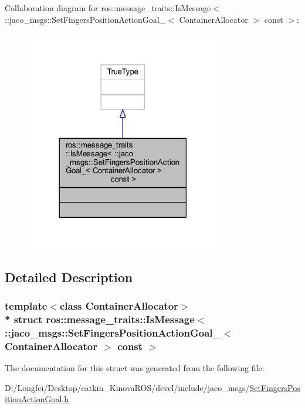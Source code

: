 Collaboration diagram for ros\+:\+:message\+\_\+traits\+:\+:Is\+Message$<$ \+:\+:jaco\+\_\+msgs\+:\+:Set\+Fingers\+Position\+Action\+Goal\+\_\+$<$ Container\+Allocator $>$ const $>$\+:
\nopagebreak
\begin{figure}[H]
\begin{center}
\leavevmode
\includegraphics[width=242pt]{d8/d36/structros_1_1message__traits_1_1IsMessage_3_01_1_1jaco__msgs_1_1SetFingersPositionActionGoal___3f488c4962163a1f29c09c2720d7050b6}
\end{center}
\end{figure}


\subsection{Detailed Description}
\subsubsection*{template$<$class Container\+Allocator$>$\\*
struct ros\+::message\+\_\+traits\+::\+Is\+Message$<$ \+::jaco\+\_\+msgs\+::\+Set\+Fingers\+Position\+Action\+Goal\+\_\+$<$ Container\+Allocator $>$ const  $>$}



The documentation for this struct was generated from the following file\+:\begin{DoxyCompactItemize}
\item 
D\+:/\+Longfei/\+Desktop/catkin\+\_\+\+Kinova\+R\+O\+S/devel/include/jaco\+\_\+msgs/\hyperlink{SetFingersPositionActionGoal_8h}{Set\+Fingers\+Position\+Action\+Goal.\+h}\end{DoxyCompactItemize}
